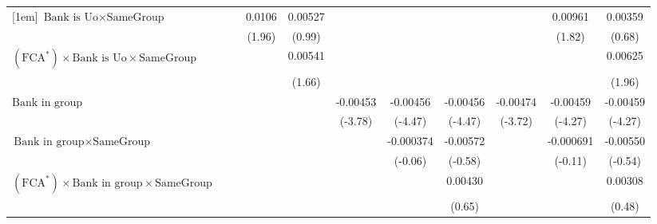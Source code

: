 {\begin{tabular}{l*{10}{c}}
[1em]
 $ \text{Bank is Uo}   \times {\text{SameGroup} } $ &                  &                  &   0.0106         &  0.00527         &                  &                  &                  &                  &  0.00961         &  0.00359         \\
                &                  &                  &   (1.96)         &   (0.99)         &                  &                  &                  &                  &   (1.82)         &   (0.68)         \\
[1em]
 $ (\text{FCA}^*) \times {\text{Bank is Uo} } \times {\text{SameGroup} } $ &                  &                  &                  &  0.00541         &                  &                  &                  &                  &                  &  0.00625         \\
                &                  &                  &                  &   (1.66)         &                  &                  &                  &                  &                  &   (1.96)         \\
[1em]
 $  {\text{Bank in group} } $ &                  &                  &                  &                  & -0.00453\sym{***}& -0.00456\sym{***}& -0.00456\sym{***}& -0.00474\sym{***}& -0.00459\sym{***}& -0.00459\sym{***}\\
                &                  &                  &                  &                  &  (-3.78)         &  (-4.47)         &  (-4.47)         &  (-3.72)         &  (-4.27)         &  (-4.27)         \\
[1em]
 $ {\text{Bank in group}  } \times {\text{SameGroup}}  $ &                  &                  &                  &                  &                  &-0.000374         & -0.00572         &                  &-0.000691         & -0.00550         \\
                &                  &                  &                  &                  &                  &  (-0.06)         &  (-0.58)         &                  &  (-0.11)         &  (-0.54)         \\
[1em]
 $ (\text{FCA}^*) \times {\text{Bank in group} }  \times {\text{SameGroup}}$ &                  &                  &                  &                  &                  &                  &  0.00430         &                  &                  &  0.00308         \\
                &                  &                  &                  &                  &                  &                  &   (0.65)         &                  &                  &   (0.48)         \\

\end{tabular}}
